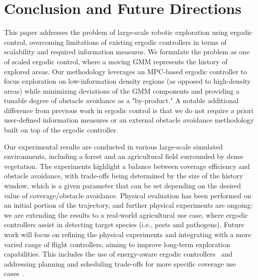 \documentclass[letterpaper,10pt,conference,twoside]{IEEEtran}
\theoremstyle{definition}
\begin{document}
\section{Conclusion and Future Directions}\label{sec:conc}
\noindent
This paper addresses the problem of large-scale robotic exploration using ergodic control, overcoming limitations of existing ergodic controllers in terms of scalability and required information measures. We formulate the problem as one of scaled ergodic control, where a moving GMM represents the history of explored areas. Our methodology leverages an MPC-based ergodic controller to focus exploration on low-information density regions (as opposed to high-density areas) while minimizing deviations of the GMM components and providing a tunable degree of obstacle avoidance as a "by-product." A notable  additional difference from previous work in ergodic control is that we do not require a priori user-defined information measures or an external obstacle avoidance methodology built on top of the ergodic controller.

Our experimental results are conducted in various large-scale simulated environments, including a forest and an agricultural field surrounded by dense vegetation. The experiments highlight a balance between coverage efficiency and obstacle avoidance, with trade-offs being determined by the size of the history window, which is a given parameter that can be set depending on the desired value of coverage/obstacle avoidance. Physical evaluation has been performed on an initial portion of the trajectory, and further physical experiments are ongoing: we are extending the results to a real-world agricultural use case, where ergodic controllers assist in detecting target species (i.e., pests and pathogens). Future work will focus on refining the physical experiments and integrating with a more varied range of flight controllers, aiming to improve long-term exploration capabilities. This includes the use of energy-aware ergodic controllers~\cite{seewald2024energy,naveed2024eclares} and addressing planning and scheduling trade-offs for more specific coverage use cases~\cite{seewald2022energy,seewaldphdthesis}.




{\small
 

}
\end{document}
